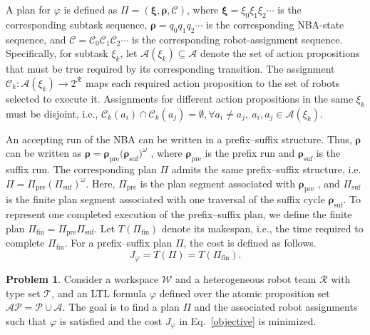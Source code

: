 \documentclass[lettersize,journal]{IEEEtran}
\theoremstyle{italiclemma}
\theoremstyle{italiclemma}
\theoremstyle{definition}
\newtheorem{problem}{Problem}
\begin{document}
A plan for $\varphi$ is defined as $\Pi=(\boldsymbol{\xi}, \boldsymbol{\rho}, \boldsymbol{\mathcal C})$, where $ \boldsymbol{\xi}=\xi_0\xi_1\xi_2\cdots$ is the corresponding subtask sequence, $\boldsymbol{\rho}=q_0q_1q_2\cdots$ is the corresponding NBA-state sequence, and $ \boldsymbol{\mathcal C}=\mathcal{C}_0\mathcal{C}_1\mathcal{C}_2\cdots$ is the corresponding robot-assignment sequence. Specifically,  for subtask $\xi_k$,  let $\mathcal A(\xi_k)\subseteq\mathcal A$ denote the set of action propositions that must be true required by its corresponding transition. The assignment $ \mathcal{C}_k:\mathcal A(\xi_k)\rightarrow 2^{\mathcal R} $ maps each required action proposition to the set of robots selected to execute it. Assignments for different action propositions in the same $\xi_k$ must be disjoint, i.e., $ \mathcal{C}_k(a_i)\cap \mathcal{C}_k(a_j)=\emptyset, \forall a_i\neq a_j,\ a_i,a_j\in\mathcal A(\xi_k). $

An accepting run of the NBA can be written in a prefix--suffix structure. Thus,  $\boldsymbol{\rho}$ can be 
written as $\boldsymbol{\rho}=\boldsymbol{\rho}_{\mathrm{pre}}\bigl(\boldsymbol{\rho}_{\mathrm{suf}}\bigr)^\omega$ , where $\boldsymbol{\rho}_{\mathrm{pre}}$ is the  prefix run and $\boldsymbol{\rho}_{\mathrm{suf}}$ is the suffix run. The corresponding plan $\Pi$ admits the same prefix--suffix structure, i.e. $\Pi = \Pi_{\mathrm{pre}}(\Pi_{\mathrm{suf}})^\omega$. Here, $ \Pi_{\mathrm{pre}}$ is the plan segment associated with $\boldsymbol{\rho}_{\mathrm{pre}}$ , and $\Pi_{\mathrm{suf}}$ is the finite plan segment associated with one traversal of the suffix cycle $\boldsymbol{\rho}_{\mathrm{suf}}$. To represent one completed execution of the prefix--suffix plan, we define the finite plan  \(\Pi_{\mathrm{fin}} =
\Pi_{\mathrm{pre}}\Pi_{\mathrm{suf}}\). Let \(T(\Pi_{\mathrm{fin}})\) denote its makespan, i.e., the time required to complete \(\Pi_{\mathrm{fin}}\). 
For a prefix--suffix plan \(\Pi\), the cost is defined as follows.
\begin{equation} \label{objective}
J_\varphi=T(\Pi)=T(\Pi_{\mathrm{fin}}).
\end{equation}

\begin{problem}
Consider a  workspace $\mathcal{W}$ and a heterogeneous robot team $\mathcal{R}$ with type set $\mathcal{T}$, and an LTL formula $\varphi$ defined over the atomic proposition set $\mathcal{AP}=\mathcal{P} \cup \mathcal{A}$.  The goal is to find a plan $\Pi$ and the associated robot assignments such that $\varphi$ is satisfied and the cost $J_\varphi$ in Eq.~\eqref{objective} is minimized.
\end{problem}
\end{document}
